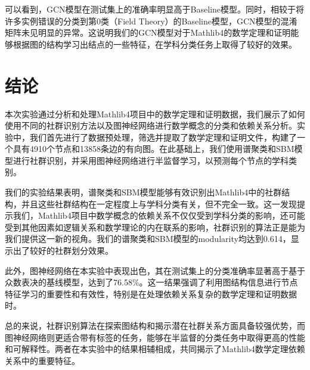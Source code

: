 可以看到，GCN模型在测试集上的准确率明显高于Baseline模型。同时，相较于将许多实例错误的分类到第0类（Field Theory）的Baseline模型，GCN模型的混淆矩阵未见明显的异常。这说明我们的GCN模型对于Mathlib4的数学定理和证明能够根据图的结构学习出结点的一些特征，在学科分类任务上取得了较好的效果。

\section{结论}

本次实验通过分析和处理Mathlib4项目中的数学定理和证明数据，我们展示了如何使用不同的社群识别方法以及图神经网络进行数学概念的分类和依赖关系分析。实验中，我们首先进行了数据预处理，筛选并提取了数学定理和证明文件，构建了一个具有4910个节点和13858条边的有向图。在此基础上，我们使用谱聚类和SBM模型进行社群识别，并采用图神经网络进行半监督学习，以预测每个节点的学科类别。

我们的实验结果表明，谱聚类和SBM模型能够有效识别出Mathlib4中的社群结构，并且这些社群结构在一定程度上与学科分类有关，但不完全一致。这一发现提示我们，Mathlib4项目中数学概念的依赖关系不仅仅受到学科分类的影响，还可能受到其他因素如逻辑关系和数学理论的内在联系的影响，社群识别的算法正是能为我们提供这一新的视角。我们的谱聚类和SBM模型的modularity均达到0.614，显示出了较好的社群划分效果。

此外，图神经网络在本实验中表现出色，其在测试集上的分类准确率显著高于基于众数表决的基线模型，达到了76.58\%。这一结果强调了利用图结构信息进行节点特征学习的重要性和有效性，特别是在处理依赖关系复杂的数学定理和证明数据时。

总的来说，社群识别算法在探索图结构和揭示潜在社群关系方面具备较强优势，而图神经网络则更适合带有标签的任务，能够在半监督的分类任务中取得更高的性能和可解释性。两者在本实验中的结果相辅相成，共同揭示了Mathlib4数学定理依赖关系中的重要特征。